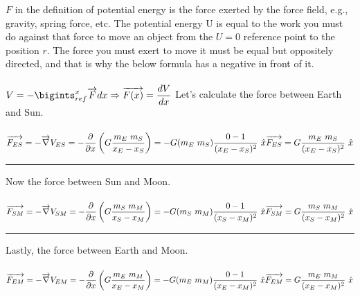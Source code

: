 \documentclass[fleqn]{article}
\begin{document}
\begin{enumerate}
\begin{enumerate}
      \textcolor{hwColor}{
        $F$ in the definition of potential energy is the force exerted by the force field, e.g., gravity, spring force, etc. 
        The potential energy U is equal to the work you must do against that force to move an object from the $U=0$ reference point to the position $r$.
        The force you must exert to move it must be equal but oppositely directed, and that is why the below formula has a negative in front of it. \\
        \\
        $
          V=-\bigints_{ref}^{x} \overrightarrow{F} dx \Rightarrow \overrightarrow{F(x)}=\dfrac{dV}{dx} \\ \\
        $
        Let's calculate the force between Earth and Sun. \\
        \\
        $
          \overrightarrow{F_{ES}}=-\overrightarrow{\nabla}V_{ES}=-\dfrac{\partial}{\partial x}\left(G\dfrac{m_E ~ m_S}{x_E-x_S}\right)=-G(m_E ~ m_S)\dfrac{0-1}{(x_E-x_S)^2} ~ \hat{x} \\
          \\
          \overrightarrow{F_{ES}}=G\dfrac{m_E ~ m_S}{(x_E-x_S)^2} ~ \hat{x} \\
        $
      }

      \textcolor{hwColor}{
        \rule{15cm}{1pt}
      }

      \textcolor{hwColor}{
        Now the force between Sun and Moon. \\ \\
        $
          \overrightarrow{F_{SM}}=-\overrightarrow{\nabla}V_{SM}=-\dfrac{\partial}{\partial x}\left(G\dfrac{m_S ~ m_M}{x_S-x_M}\right)=-G(m_S ~ m_M)\dfrac{0-1}{(x_S-x_M)^2} ~ \hat{x} \\
          \\
          \overrightarrow{F_{SM}}=G\dfrac{m_S ~ m_M}{(x_S-x_M)^2} ~ \hat{x} \\
        $
      }

      \textcolor{hwColor}{
        \rule{15cm}{1pt}
      }

      \textcolor{hwColor}{
        Lastly, the force between Earth and Moon. \\ \\
        $
          \overrightarrow{F_{EM}}=-\overrightarrow{\nabla}V_{EM}=-\dfrac{\partial}{\partial x}\left(G\dfrac{m_E ~ m_M}{x_E-x_M}\right)=-G(m_E ~ m_M)\dfrac{0-1}{(x_E-x_M)^2} ~ \hat{x} \\
          \\
          \overrightarrow{F_{EM}}=G\dfrac{m_E ~ m_M}{(x_E-x_M)^2} ~ \hat{x} \\
        $
      }


\end{enumerate}
\end{enumerate}
\end{document}
